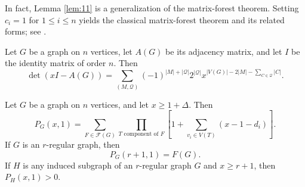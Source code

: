 \documentclass[11pt, a4paper]{article}
\begin{document}
In fact, Lemma \ref{lem:11} is a generalization of the matrix-forest theorem.
Setting $c_i=1$ for $1\leq i\leq n$
yields the classical matrix-forest theorem and its related forms; see \cite{Chebotarev1997}.
\begin{lemma}
Let $G$ be a graph on $n$ vertices, let $A(G)$ be its adjacency matrix, and let $I$ be the identity matrix of order $n$.
Then
\begin{equation}\label{eq:4}
\det(xI-A(G))
=
\sum_{(M, \mathcal{Q})}
(-1)^{|M|+|\mathcal{Q}|}2^{|\mathcal{Q}|}
x^{|V(G)|-2|M|-\sum_{C\in \mathcal{Q}}|C|}.
\end{equation}
\end{lemma}
\begin{lemma}\label{lem:forest-identity}
Let $G$ be a graph on $n$ vertices, and let $x\geq 1+\Delta$.
Then
\begin{equation}\label{eq:forest-identity}
 P_G(x,1)
 =\sum_{F\in\mathcal{F}(G)}
   \prod_{T \text{ component of } F}
   \left[1+\sum_{v_i\in V(T)}(x-1-d_i)\right].
\end{equation}
If $G$ is an $r$-regular graph, then
\begin{equation}\label{eq:F-exact}
 P_G(r+1,1)=F(G).
\end{equation}
If $H$ is any induced subgraph of an $r$-regular graph $G$ and $x\geq r+1$, then $P_H(x,1)>0$.
\end{lemma}
\end{document}
